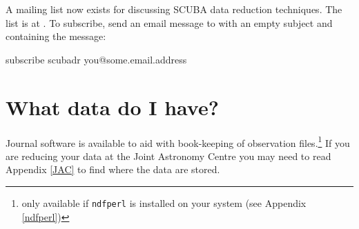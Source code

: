 \documentclass[twoside,11pt]{starlink}
\begin{document}
A mailing list now exists for discussing SCUBA data reduction techniques.  The
list is at
. To
subscribe, send an email message to
with an empty subject and containing the message:
\begin{terminalv}
subscribe scubadr you@some.email.address
\end{terminalv}


\section{What data do I have?\label{journal}}

Journal software is available to aid with book-keeping of observation
files.\footnote{only available if \texttt{ndfperl} is installed on your system
(see Appendix \ref{ndfperl})}  If you are reducing your data at the Joint
Astronomy Centre you may need to read Appendix \ref{JAC} to find where the
data are stored.
\end{document}
